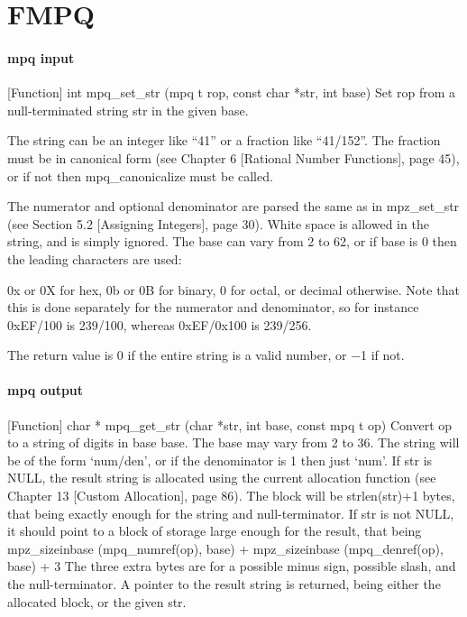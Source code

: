\chapter{FMPQ}
\lipsum[1]



\subsubsection{mpq input}
[Function] int mpq\_set\_str (mpq t rop, const char *str, int base)
Set rop from a null-terminated string str in the given base.

The string can be an integer like “41” or a fraction like “41/152”. The fraction must be
in canonical form (see Chapter 6 [Rational Number Functions], page 45), or if not then
mpq\_canonicalize must be called.

The numerator and optional denominator are parsed the same as in mpz\_set\_str (see
Section 5.2 [Assigning Integers], page 30). White space is allowed in the string, and is simply
ignored. The base can vary from 2 to 62, or if base is 0 then the leading characters are used:

0x or 0X for hex, 0b or 0B for binary, 0 for octal, or decimal otherwise. Note that this is done
separately for the numerator and denominator, so for instance 0xEF/100 is 239/100, whereas
0xEF/0x100 is 239/256.

The return value is 0 if the entire string is a valid number, or −1 if not.



\subsubsection{mpq output}

[Function] char * mpq\_get\_str (char *str, int base, const mpq t op)
Convert op to a string of digits in base base. The base may vary from 2 to 36. The string
will be of the form ‘num/den’, or if the denominator is 1 then just ‘num’.
If str is NULL, the result string is allocated using the current allocation function (see
Chapter 13 [Custom Allocation], page 86). The block will be strlen(str)+1 bytes, that
being exactly enough for the string and null-terminator.
If str is not NULL, it should point to a block of storage large enough for the result, that being
mpz\_sizeinbase (mpq\_numref(op), base)
+ mpz\_sizeinbase (mpq\_denref(op), base) + 3
The three extra bytes are for a possible minus sign, possible slash, and the null-terminator.
A pointer to the result string is returned, being either the allocated block, or the given str.


